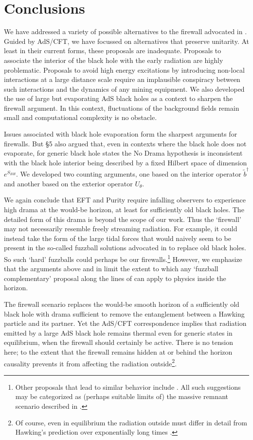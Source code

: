 \documentclass[12pt]{article}
\newcommand{\sect}[1]{\section{#1}\setcounter{equation}{0}}
\begin{document}
\sect{Conclusions}

We have addressed a variety of possible alternatives to the firewall advocated in \cite{Almheiri:2012rt}.
Guided by AdS/CFT, we have focussed on alternatives that preserve unitarity.  At least in their current forms, these proposals are inadequate.  Proposals to associate the interior of the black hole with the early radiation are highly problematic. Proposals to avoid high energy excitations by introducing non-local interactions at a large distance scale require an implausible conspiracy between such interactions and the dynamics of any mining equipment. We also developed the use of large but evaporating AdS black holes as a context to sharpen the firewall argument.  In this context, fluctuations of the background fields remain small and computational complexity is no obstacle.

Issues associated with black hole evaporation form the sharpest arguments for firewalls.  But \S5 also argued that, even in contexts where the black hole does not evaporate, for generic black hole states the No Drama hypothesis is inconsistent with the black hole interior being described by a fixed Hilbert space of dimension $e^{S_{BH}}$.  We developed two counting arguments, one based on the interior operator $\tilde b^\dagger$ and another based on the exterior operator $U_\theta$.

We again conclude that EFT and Purity require infalling observers to experience high drama at the would-be horizon, at least for sufficiently old black holes.  The detailed form of this drama is beyond the scope of our work.  Thus the `firewall' may not necessarily resemble freely streaming radiation.  For example, it could instead take the form of the large tidal forces that would naively seem to be present in the so-called fuzzball solutions advocated in {\cite{Mathur:2009hf}}
 to replace old black holes.   So such `hard' fuzzballs could perhaps be our firewalls.\footnote{Other proposals that lead to similar behavior include \cite{Chapline:2000en,Mazur:2001fv,Winterberg,Davidson:2011eu,Giveon:2012kp}.  All such suggestions may be categorized as (perhaps suitable limits of) the massive remnant scenario described in \cite{Giddings:1992hh}.}  However, we emphasize that {the arguments above and in \cite{Almheiri:2012rt} limit the extent to which any `fuzzball complementary' proposal along the lines of {\cite{Mathur:2012jk}} can apply to physics inside the horizon.}

The firewall scenario replaces the would-be smooth horizon of a sufficiently old black hole with drama sufficient to remove the entanglement between a Hawking particle and its partner.  Yet the AdS/CFT correspondence implies that radiation emitted by a large AdS black hole remains thermal even for generic states in equilibrium, when the firewall should certainly be active. There is no tension here; to the extent that the firewall remains hidden at or behind the horizon causality prevents it from affecting the radiation outside\footnote{Of course, even in equilibrium the radiation outside must differ in detail from Hawking's prediction over exponentially long times \cite{Maldacena:2001kr}.}.
\end{document}
